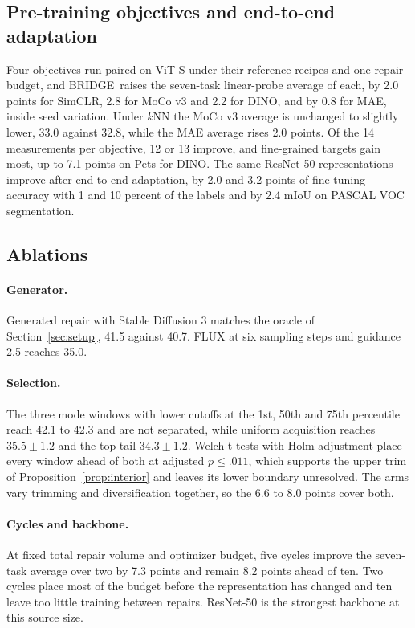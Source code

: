 \documentclass{article}
\newcommand{\method}{BRIDGE}
\begin{document}
\subsection{Pre-training objectives and end-to-end adaptation}
\label{sec:objectives}

Four objectives run paired on ViT-S under their reference recipes and one repair budget, and \method\ raises the seven-task linear-probe average of each, by 2.0 points for SimCLR, 2.8 for MoCo v3 and 2.2 for DINO, and by 0.8 for MAE, inside seed variation. Under $k$NN the MoCo v3 average is unchanged to slightly lower, 33.0 against 32.8, while the MAE average rises 2.0 points. Of the 14 measurements per objective, 12 or 13 improve, and fine-grained targets gain most, up to 7.1 points on Pets for DINO. The same ResNet-50 representations improve after end-to-end adaptation, by 2.0 and 3.2 points of fine-tuning accuracy with 1 and 10 percent of the labels and by 2.4 mIoU on PASCAL VOC segmentation.

\subsection{Ablations}
\label{sec:ablations}



\paragraph{Generator.} Generated repair with Stable Diffusion 3 matches the oracle of Section~\ref{sec:setup}, 41.5 against 40.7. FLUX at six sampling steps and guidance 2.5 reaches 35.0.

\paragraph{Selection.} The three mode windows with lower cutoffs at the 1st, 50th and 75th percentile reach 42.1 to 42.3 and are not separated, while uniform acquisition reaches $35.5\pm1.2$ and the top tail $34.3\pm1.2$. Welch t-tests with Holm adjustment place every window ahead of both at adjusted $p\leq.011$, which supports the upper trim of Proposition~\ref{prop:interior} and leaves its lower boundary unresolved. The arms vary trimming and diversification together, so the 6.6 to 8.0 points cover both.

\paragraph{Cycles and backbone.} At fixed total repair volume and optimizer budget, five cycles improve the seven-task average over two by 7.3 points and remain 8.2 points ahead of ten. Two cycles place most of the budget before the representation has changed and ten leave too little training between repairs. ResNet-50 is the strongest backbone at this source size.
\end{document}
